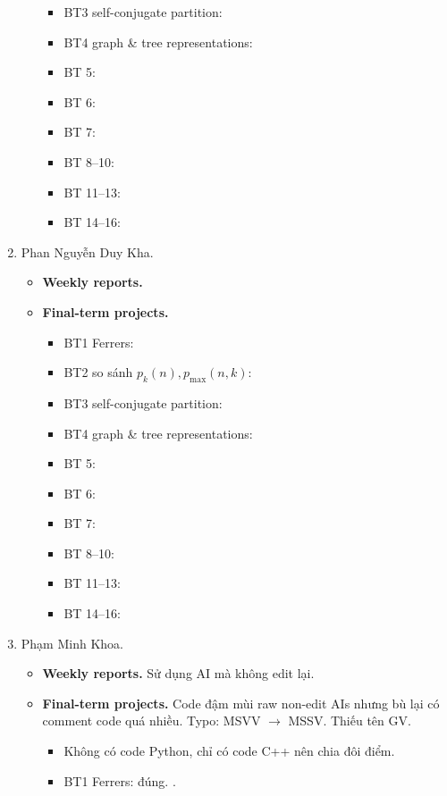 \documentclass{article}
\begin{document}
\begin{enumerate}
\begin{itemize}
\begin{itemize}
            \item BT3 self-conjugate partition:
            \item BT4 graph \& tree representations:
            \item BT 5:
            \item BT 6:
            \item BT 7:
            \item BT 8--10:
            \item BT 11--13:
            \item BT 14--16:
        \end{itemize}
    \end{itemize}
    \item {\sc Phan Nguyễn Duy Kha.}
    \begin{itemize}
        \item {\bf Weekly reports.}
        \item {\bf Final-term projects.}
        \begin{itemize}
            \item BT1 Ferrers:
            \item BT2 so sánh $p_k(n),p_{\max}(n,k)$:
            \item BT3 self-conjugate partition:
            \item BT4 graph \& tree representations:
            \item BT 5:
            \item BT 6:
            \item BT 7:
            \item BT 8--10:
            \item BT 11--13:
            \item BT 14--16:
        \end{itemize}
    \end{itemize}
    \item {\sc Phạm Minh Khoa.}
    \begin{itemize}
        \item {\bf Weekly reports.} Sử dụng AI mà không  edit lại.
        \item {\bf Final-term projects.} Code đậm mùi raw non-edit AIs nhưng bù lại có comment code quá nhiều. Typo: MSVV $\to$ MSSV. Thiếu tên GV.
        \begin{itemize}
            \item Không có code Python, chỉ có code C++ nên chia đôi điểm.
            \item BT1 Ferrers: đúng. .

\end{itemize}
\end{itemize}
\end{enumerate}
\end{document}
